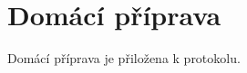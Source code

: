 \documentclass[english]{article}
\begin{document}
\section{Domácí příprava}
	Domácí příprava je přiložena k protokolu.
%	
%	
%	
%	
%	
\end{document}
